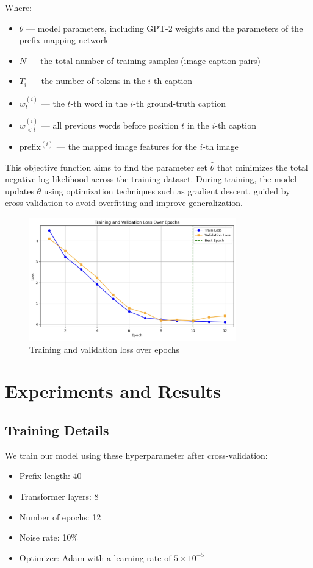 \documentclass[11pt]{article}
\begin{document}
Where:
\begin{itemize}
    \item $\theta$ — model parameters, including GPT-2 weights and the parameters of the prefix mapping network  
    \item $N$ — the total number of training samples (image-caption pairs)  
    \item $T_i$ — the number of tokens in the $i$-th caption  
    \item $w_t^{(i)}$ — the $t$-th word in the $i$-th ground-truth caption  
    \item $w_{<t}^{(i)}$ — all previous words before position $t$ in the $i$-th caption  
    \item $\text{prefix}^{(i)}$ — the mapped image features for the $i$-th image
\end{itemize}

This objective function aims to find the parameter set $\hat{\theta}$ that minimizes the total negative log-likelihood 
across the training dataset. During training, the model updates $\theta$ using optimization 
techniques such as gradient descent, guided by cross-validation to avoid overfitting and improve generalization.
\begin{figure}[h]
    \centering
    \includegraphics[width=0.8\textwidth]{f2.png}
    \caption{Training and validation loss over epochs}
    \end{figure}
\pagebreak
\section{Experiments and Results}
\subsection{Training Details}
We train our model using these hyperparameter after cross-validation:
\begin{itemize}
  \item Prefix length: 40
  \item Transformer layers: 8
  \item Number of epochs: 12
  \item Noise rate: 10\%
  \item Optimizer: Adam with a learning rate of $5 \times 10^{-5}$
\end{itemize}
\end{document}
